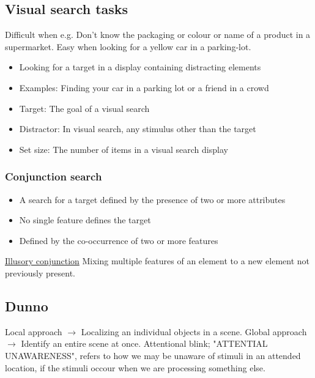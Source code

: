 \documentclass{article}
\begin{document}
\subsection{Visual search tasks}
Difficult when e.g. Don't know the packaging or colour or name of a product in a supermarket. Easy when looking for a yellow car in a parking-lot.
\begin{itemize}
  \item Looking for a target in a display containing distracting elements
  \item Examples: Finding your car in a parking lot or a friend in a crowd
  \item Target: The goal of a visual search
  \item Distractor: In visual search, any stimulus other than the target
  \item Set size: The number of items in a visual search display
\end{itemize}
\subsubsection{Conjunction search}
\begin{itemize}
  \item A search for a target defined by the presence of two or more attributes
  \item No single feature defines the target
  \item Defined by the co-occurrence of two or more features
\end{itemize}
\underline{Illusory conjunction}
Mixing multiple features of an element to a new element not previously present.\\
\subsection{Dunno}
Local approach $\rightarrow$ Localizing an individual objects in a scene.
Global approach $\rightarrow$ Identify an entire scene at once.
Attentional blink; "ATTENTIAL UNAWARENESS", refers to how we may be unaware of stimuli in an attended location, if the stimuli occour when we are processing something else.
\end{document}
